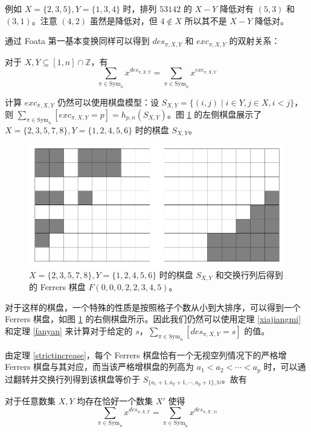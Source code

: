 \documentclass{noithesis}
\begin{document}
	例如 $X=\{2,3,5\},Y=\{1,3,4\}$ 时，排列 $53142$ 的 $X-Y$ 降低对有 $(5,3)$ 和 $(3,1)$。注意 $(4,2)$ 虽然是降低对，但 $4 \not\in X$ 所以其不是 $X-Y$ 降低对。
	
	通过 Foata 第一基本变换同样可以得到 $des_{\pi,X,Y}$ 和 $exc_{\pi,X,Y}$ 的双射关系：
	
	\begin{theorem}\label{desxy=excxy}
		对于 $X,Y \subseteq [1,n] \cap \mathbb{Z}$，有\begin{equation}
		\sum_{\pi \in \mathrm{Sym}_n} x^{des_{\pi,X,Y}} = \sum_{\pi \in \mathrm{Sym}_n} x^{exc_{\pi,X,Y}}
		\end{equation}
	\end{theorem}
	
	计算 $exc_{\pi,X,Y}$ 仍然可以使用棋盘模型：设 $S_{X,Y} = \{(i,j) \mid i \in Y , j \in X , i < j \}$，则 $\sum_{\pi \in \mathrm{Sym}_n} [exc_{\pi,X,Y} = p] = h_{p,n}(S_{X,Y})$。图 \ref{f10} 的左侧棋盘展示了 $X=\{2,3,5,7,8\},Y=\{1,2,4,5,6\}$ 时的棋盘 $S_{X,Y}$。
	
	\begin{figure}[h]
		\centering
		\caption{$X=\{2,3,5,7,8\},Y=\{1,2,4,5,6\}$ 时的棋盘 $S_{X,Y}$ 和交换行列后得到的 Ferrers 棋盘 $F(0,0,0,2,2,3,4,5)$。}
		\label{f10}
		\includegraphics[scale=0.3]{picture/figure10.png}
	\end{figure}
	
	对于这样的棋盘，一个特殊的性质是按照格子个数从小到大排序，可以得到一个 Ferrers 棋盘，如图 \ref{f10} 的右侧棋盘所示。因此我们仍然可以使用定理 \ref{xiajiangmi} 和定理 \ref{fanyan} 来计算对于给定的 $s$，$\sum_{\pi \in \mathrm{Sym}_n} [des_{\pi,X,Y} = s]$ 的值。
	
	由定理 \ref{strictincrease}，每个 Ferrers 棋盘恰有一个无视空列情况下的严格增 Ferrers 棋盘与其对应，而当该严格增棋盘的列高为 $a_1<a_2<\cdots<a_p$ 时，可以通过翻转并交换行列得到该棋盘等价于 $S_{\{a_1+1,a_2+1,\cdots,a_p+1\} , \mathbb{N}}$。故有
	\begin{theorem}\label{X'}
		对于任意数集 $X,Y$ 均存在恰好一个数集 $X'$ 使得 \begin{equation}
		\sum_{\pi \in \mathrm{Sym}_n} x^{des_{\pi,X,Y}} = \sum_{\pi \in \mathrm{Sym}_n} x^{des_{\pi,X',\mathbb{N}}}
		\end{equation}
	\end{theorem}
	
\end{document}
